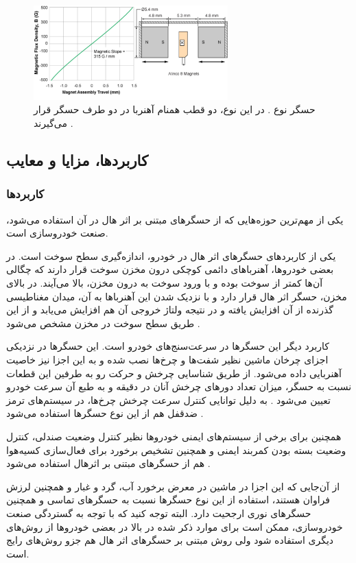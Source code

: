 \begin{figure}[t]
	
	\centering 
	\includegraphics[width=75mm]{Images/8.pdf}
	\caption{حسگر نوع . در این نوع، دو قطب همنام  آهنربا در دو طرف حسگر قرار می‌گیرند
		\cite{alleg}.
	}\label{fig:7}
\end{figure}


\subsection{کاربردها، مزایا و معایب}

\subsubsection{کاربردها}
یکی از مهم‌ترین حوزه‌هایی که از حسگر‌های مبتنی بر اثر هال در آن استفاده می‌شود، صنعت خودروسازی است. 

یکی از کاربردهای حسگر‌های اثر هال در خودرو، اندازه‌گیری سطح سوخت است. در بعضی خودروها، آهنرباهای دائمی کوچکی درون مخزن سوخت قرار دارند که چگالی آن‌ها کمتر از سوخت بوده و با ورود سوخت به درون مخزن، بالا می‌آیند. در بالای مخزن، حسگر اثر هال قرار دارد و با نزدیک شدن این آهنرباها به آن، میدان مغناطیسی گذرنده از آن افزایش یافته و در نتیجه ولتاژ خروجی آن‌ هم افزایش می‌یابد و از این طریق سطح سوخت در مخزن مشخص می‌شود \cite{rs}.

کاربرد دیگر این حسگرها در سرعت‌سنج‌های خودرو 
است. این حسگر‌ها در نزدیکی اجزای چرخان ماشین نظیر شفت‌ها و چرخ‌ها نصب شده و به این اجزا نیز خاصیت آهنربایی داده می‌شود. از طریق شناسایی چرخش و حرکت رو به طرفین این قطعات نسبت به حسگر، میزان تعداد دور‌های چرخش آنان در دقیقه و به طبع آن سرعت خودرو تعیین می‌شود  \cite{rs}. به دلیل توانایی کنترل سرعت چرخش چرخ‌ها، در سیستم‌های ترمز ضدقفل
هم از این نوع حسگر‌ها استفاده می‌شود
\cite{magnelink}.

همچنین برای برخی از سیستم‌های ایمنی خودروها نظیر کنترل وضعیت صندلی، کنترل وضعیت بسته بودن کمربند ایمنی و همچنین تشخیص برخورد برای فعال‌سازی کسیه‌هوا هم از حسگرهای مبتنی بر اثرهال استفاده می‌شود \cite{magnelink}.

از آن‌جایی که این اجزا در ماشین در معرض برخورد آب، گرد و غبار و همچنین لرزش فراوان هستند، استفاده از این نوع حسگر‌ها نسبت به حسگر‌های تماسی و همچنین حسگر‌های نوری ارجحیت دارد. البته توجه کنید که با توجه به گستردگی صنعت خودروسازی، ممکن است برای موارد ذکر شده در بالا در بعضی خودروها از روش‌های دیگری استفاده شود ولی روش مبتنی بر حسگر‌های اثر‌ هال هم جزو روش‌های رایج است. 

